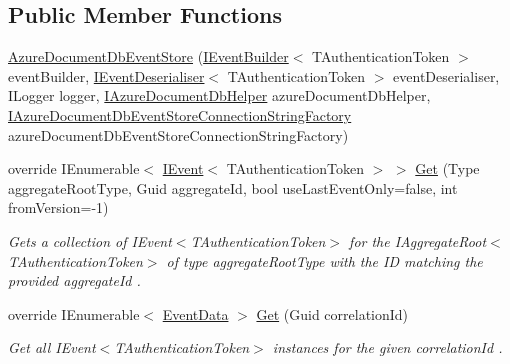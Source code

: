 \subsection*{Public Member Functions}
\begin{DoxyCompactItemize}
\item 
\hyperlink{classCqrs_1_1Azure_1_1DocumentDb_1_1Events_1_1AzureDocumentDbEventStore_a0bbf294600f2dcebfcca28143aacd430_a0bbf294600f2dcebfcca28143aacd430}{Azure\+Document\+Db\+Event\+Store} (\hyperlink{interfaceCqrs_1_1Events_1_1IEventBuilder}{I\+Event\+Builder}$<$ T\+Authentication\+Token $>$ event\+Builder, \hyperlink{interfaceCqrs_1_1Events_1_1IEventDeserialiser}{I\+Event\+Deserialiser}$<$ T\+Authentication\+Token $>$ event\+Deserialiser, I\+Logger logger, \hyperlink{interfaceCqrs_1_1Azure_1_1DocumentDb_1_1IAzureDocumentDbHelper}{I\+Azure\+Document\+Db\+Helper} azure\+Document\+Db\+Helper, \hyperlink{interfaceCqrs_1_1Azure_1_1DocumentDb_1_1Events_1_1IAzureDocumentDbEventStoreConnectionStringFactory}{I\+Azure\+Document\+Db\+Event\+Store\+Connection\+String\+Factory} azure\+Document\+Db\+Event\+Store\+Connection\+String\+Factory)
\item 
override I\+Enumerable$<$ \hyperlink{interfaceCqrs_1_1Events_1_1IEvent}{I\+Event}$<$ T\+Authentication\+Token $>$ $>$ \hyperlink{classCqrs_1_1Azure_1_1DocumentDb_1_1Events_1_1AzureDocumentDbEventStore_a54f298fdde141166e23f01e4911bf188_a54f298fdde141166e23f01e4911bf188}{Get} (Type aggregate\+Root\+Type, Guid aggregate\+Id, bool use\+Last\+Event\+Only=false, int from\+Version=-\/1)
\begin{DoxyCompactList}\small\item\em Gets a collection of I\+Event$<$\+T\+Authentication\+Token$>$ for the I\+Aggregate\+Root$<$\+T\+Authentication\+Token$>$ of type {\itshape aggregate\+Root\+Type}  with the ID matching the provided {\itshape aggregate\+Id} . \end{DoxyCompactList}\item 
override I\+Enumerable$<$ \hyperlink{classCqrs_1_1Events_1_1EventData}{Event\+Data} $>$ \hyperlink{classCqrs_1_1Azure_1_1DocumentDb_1_1Events_1_1AzureDocumentDbEventStore_ac59ce599b768ce047869b8ac135f4e22_ac59ce599b768ce047869b8ac135f4e22}{Get} (Guid correlation\+Id)
\begin{DoxyCompactList}\small\item\em Get all I\+Event$<$\+T\+Authentication\+Token$>$ instances for the given {\itshape correlation\+Id} . \end{DoxyCompactList}\end{DoxyCompactItemize}
